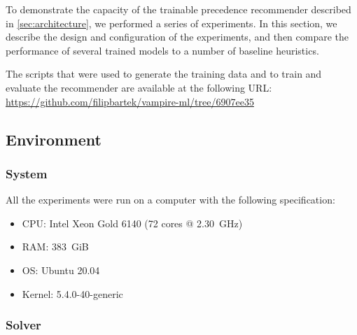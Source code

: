 
To demonstrate the capacity of the trainable precedence recommender described in \cref{sec:architecture},
we performed a series of experiments.
In this section, we describe the design and configuration of the experiments,
and then compare the performance of several trained models to a number of baseline heuristics.

The scripts that were used to generate the training data and to train and evaluate the recommender
are available at the following URL:
\url{https://github.com/filipbartek/vampire-ml/tree/6907ee35}

\subsection{Environment}

\subsubsection{System}

All the experiments were run on a computer with the following specification:

\begin{itemize}
\item CPU: Intel Xeon Gold 6140 (72 cores @ \SI{2.30}{GHz})
\item RAM: \SI{383}{GiB}
\item OS: Ubuntu 20.04
\item Kernel: 5.4.0-40-generic
\end{itemize}


\subsubsection{Solver}

